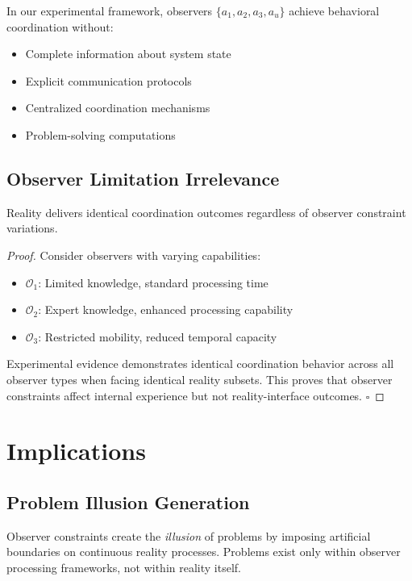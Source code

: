 \documentclass{article}
\begin{document}
\begin{observation}
In our experimental framework, observers $\{a_1, a_2, a_3, a_u\}$ achieve behavioral coordination without:
\begin{itemize}
    \item Complete information about system state
    \item Explicit communication protocols
    \item Centralized coordination mechanisms
    \item Problem-solving computations
\end{itemize}
\end{observation}

\subsection{Observer Limitation Irrelevance}
\begin{theorem}
Reality delivers identical coordination outcomes regardless of observer constraint variations.
\end{theorem}

\begin{proof}
Consider observers with varying capabilities:
\begin{itemize}
    \item $\mathcal{O}_1$: Limited knowledge, standard processing time
    \item $\mathcal{O}_2$: Expert knowledge, enhanced processing capability  
    \item $\mathcal{O}_3$: Restricted mobility, reduced temporal capacity
\end{itemize}

Experimental evidence demonstrates identical coordination behavior across all observer types when facing identical reality subsets. This proves that observer constraints affect internal experience but not reality-interface outcomes. $\square$
\end{proof}

\section{Implications}

\subsection{Problem Illusion Generation}
Observer constraints create the \emph{illusion} of problems by imposing artificial boundaries on continuous reality processes. Problems exist only within observer processing frameworks, not within reality itself.
\end{document}
